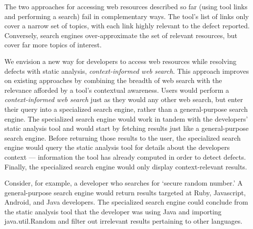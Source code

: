\documentclass[10pt,journal,compsoc]{IEEEtran}
\begin{document}
The two approaches for accessing web resources described so far (using tool links and performing a search) fail in complementary ways. 
The tool's list of links only cover a narrow set of topics, with each link highly relevant to the defect reported. 
Conversely, search engines over-approximate the set of relevant resources, but cover far more topics of interest. 

We envision a new way for developers to access web resources while resolving defects with static analysis, \textit{context-informed web search}. This approach improves on existing approaches by combining the breadth of web search with the relevance afforded by a tool's contextual awareness.
Users would perform a \textit{context-informed web search} just as they would any other web search, but enter their query into a specialized search engine, rather than a general-purpose search engine.
The specialized search engine would work in tandem with the developers' static analysis tool and would start by fetching results just like a general-purpose search engine.
Before returning those results to the user, the specialized search engine would query the static analysis tool for details about the developers context --- information the tool has already computed in order to detect defects.
Finally, the specialized search engine would only display context-relevant results.

Consider, for example, a developer who searches for `secure random number.'
A general-purpose search engine would return results targeted at Ruby, Javascript, Android, and Java developers.
The specialized search engine could conclude from the static analysis tool that the developer was using Java and importing java.util.Random and filter out irrelevant results pertaining to other languages.


\end{document}
